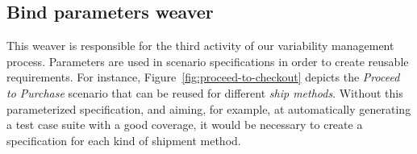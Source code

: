 \documentclass{report}
\begin{document}
\begin{frontmatter}
{%




\subsection{Bind parameters weaver}\label{sub:bind-weaver}

This weaver is responsible for the third activity of our variability
management process. Parameters are used in scenario specifications 
in order to create reusable requirements. 
For instance, Figure~\ref{fig:proceed-to-checkout} depicts the \emph{Proceed to Purchase} 
scenario that can be reused for different \emph{ship methods}. Without this
parameterized specification, and aiming, for example, at automatically generating a test case suite 
with a good coverage, it would be necessary to create a specification for each kind of shipment method.

}
\end{frontmatter}
\end{document}
